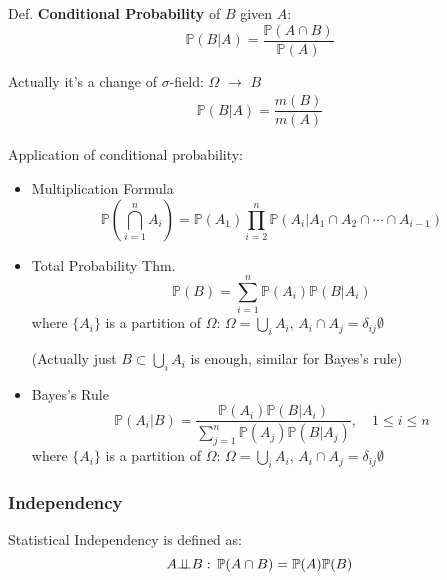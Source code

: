     Def. \textbf{Conditional Probability} of $B$ given $A$:
    \begin{equation}    
        \mathbb{P}(B|A)=\frac{\mathbb{P}(A\cap B)}{\mathbb{P}(A)}    
    \end{equation}

    Actually it's a change of $\sigma$-field: $\Omega$ $ \to $ $B$
    \begin{align}
        \mathbb{P}\left( B|A \right) = \dfrac{m(B)}{m(A)} 
    \end{align}


\begin{point}
    Application of conditional probability:
\end{point}

        \begin{itemize}
        \item Multiplication Formula
        \begin{equation}    
            \mathbb{P}(\bigcap_{i=1}^n A_i)=\mathbb{P}(A_1)\prod_{i=2}^n \mathbb{P}(A_i|A_1\cap A_2\cap \cdots\cap A_{i-1})    
        \end{equation}
        \item Total Probability Thm.
        \begin{equation}    
            \mathbb{P}(B)=\sum_{i=1}^n \mathbb{P}(A_i)\mathbb{P}(B|A_i)  
        \end{equation}
        where $\{A_i\}$ is a partition of $\Omega$: $ \Omega =\bigcup_{i}A_i ,\, A_i\cap A_j=\delta _{ij}\emptyset$

        (Actually just $ B\subset \bigcup_{i}A_i $ is enough, similar for Bayes's rule)
        \item Bayes's Rule
        \begin{equation}    
            \mathbb{P}(A_i|B)=\dfrac{\mathbb{P}(A_i)\mathbb{P}(B|A_i)}{\sum_{j=1}^n\mathbb{P}(A_j)\mathbb{P}(B|A_j)}    ,\quad 1\leq i\leq n
        \end{equation}
        where $\{A_i\}$ is a partition of $\Omega$: $ \Omega =\bigcup_{i}A_i,\, A_i\cap A_j=\delta _{ij}\emptyset $
    \end{itemize}

\subsubsection{Independency}
    Statistical Independency is defined as:
    \begin{equation}    
        A\bot\!\!\!\bot B:\,\mathbb{P}(A\cap B) =\mathbb{P}(A)\mathbb{P}(B)
    \end{equation}

